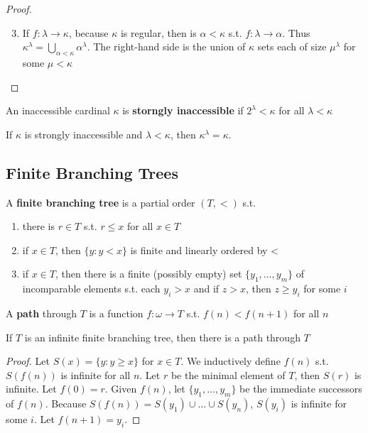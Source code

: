 \documentclass[11pt]{article}
\begin{document}
\begin{proof}
\begin{enumerate}
\setcounter{enumi}{2}
\item If \(f:\lambda\to\kappa\), because \(\kappa\) is regular, then is \(\alpha<\kappa\) s.t. \(f:\lambda\to\alpha\). Thus
\(\kappa^\lambda=\bigcup_{\alpha<\kappa}\alpha^\lambda\). The right-hand side is the union of \(\kappa\) sets each of size \(\mu^\lambda\) for some \(\mu<\kappa\)
\end{enumerate}
\end{proof}

An inaccessible cardinal \(\kappa\) is \textbf{storngly inaccessible} if \(2^\lambda<\kappa\) for all \(\lambda<\kappa\)

\begin{corollary}[]
If \(\kappa\) is strongly inaccessible and \(\lambda<\kappa\), then \(\kappa^\lambda=\kappa\).
\end{corollary}
\subsection{Finite Branching Trees}
\label{sec:org42159f2}
\begin{definition}[]
A \textbf{finite branching tree} is a partial order \((T,<)\) s.t.
\begin{enumerate}
\item there is \(r\in T\) s.t. \(r\le x\) for all \(x\in T\)
\item if \(x\in T\), then \(\{y:y<x\}\) is finite and linearly ordered by <
\item if \(x\in T\), then there is a finite (possibly empty) set \(\{y_1,\dots,y_m\}\) of incomparable
elements s.t. each \(y_i>x\) and if \(z>x\), then \(z\ge y_i\) for some \(i\)
\end{enumerate}
\end{definition}

A \textbf{path} through \(T\) is a function \(f:\omega\to T\) s.t. \(f(n)<f(n+1)\) for all \(n\)

\begin{lemma}
\label{lemmaA.21}
If \(T\) is an infinite finite branching tree, then there is a path through \(T\)
\end{lemma}

\begin{proof}
Let \(S(x)=\{y:y\ge x\}\) for \(x\in T\). We inductively define \(f(n)\) s.t. \(S(f(n))\) is infinite
for all \(n\). Let \(r\) be the minimal element of \(T\), then \(S(r)\) is infinite.
Let \(f(0)=r\). Given \(f(n)\), let \(\{y_1,\dots,y_m\}\) be the immediate successors of \(f(n)\).
Because \(S(f(n))=S(y_1)\cup\dots\cup S(y_n)\), \(S(y_i)\) is infinite for some \(i\). Let \(f(n+1)=y_i\).
\end{proof}
\end{document}
